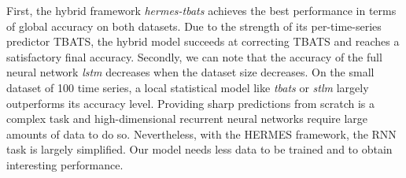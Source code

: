 \documentclass[review]{elsarticle}
\begin{document}
First, the hybrid framework \textit{hermes-tbats} achieves the best performance in terms of global accuracy on both datasets. Due to the strength of its per-time-series predictor TBATS, the hybrid model succeeds at correcting TBATS  and reaches a satisfactory final accuracy. Secondly, we can note that the accuracy of the full neural network \textit{lstm} decreases when the dataset size decreases. On the small dataset of 100 time series, a local statistical model like \textit{tbats} or \textit{stlm} largely outperforms its accuracy level. Providing sharp predictions from scratch is a complex task and high-dimensional recurrent neural networks require  large amounts of data to do so. Nevertheless, with the HERMES framework, the RNN task is largely simplified. Our model needs less data to be trained and to obtain interesting performance.
\end{document}
